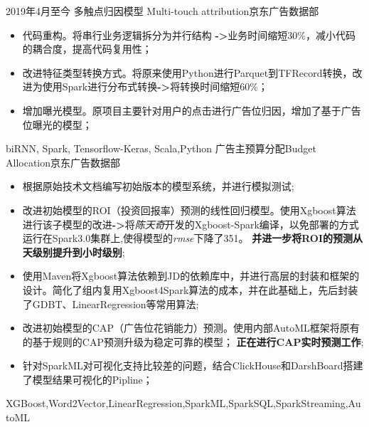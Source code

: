 %
%



\begin{experiences}

 \experience
    {2019年4月至今}   {多触点归因模型}{ Multi-touch attribution}{京东广告数据部}
     {}{
                      \begin{itemize}

                        \item 代码重构。将串行业务逻辑拆分为并行结构 \textbf{->}业务时间缩短30\%，减小代码的耦合度，提高代码复用性；
                        \item 改进特征类型转换方式。将原来使用Python进行Parquet到TFRecord转换，改进为使用Spark进行分布式转换\textbf{->}将转换时间缩短60\%；
                        \item 增加曝光模型。原项目主要针对用户的点击进行广告位归因，增加了基于广告位曝光的模型；

                      \end{itemize}
                    }
                    {biRNN, Spark, Tensorflow-Keras, Scala,Python}
  \emptySeparator
  \experience
    { } {广告主预算分配}{Budget Allocation}{京东广告数据部}
    {}    {
                      \begin{itemize}
                        \item 根据原始技术文档编写初始版本的模型系统，并进行模拟测试;
                        \item 改进初始模型的ROI（投资回报率）预测的线性回归模型。使用Xgboost算法进行该子模型的改进\textbf{->}将\emph{陈天奇}开发的Xgboost-Spark编译，以免部署的方式运行在Spark3.0集群上,使得模型的\emph{rmse}下降了351。 \textbf{并进一步将ROI的预测从天级别提升到小时级别};
                        \item 使用Maven将Xgboost算法依赖到JD的依赖库中，并进行高层的封装和框架的设计。简化了组内复用Xgboost4Spark算法的成本，并在此基础上，先后封装了GDBT、LinearRegression等常用算法;
                        \item 改进初始模型的CAP（广告位花销能力）预测。使用内部AutoML框架将原有的基于规则的CAP预测升级为稳定可靠的模型； \textbf{正在进行CAP实时预测工作};
                        \item 针对SparkML对可视化支持比较差的问题，结合ClickHouse和DarshBoard搭建了模型结果可视化的Pipline；
                      \end{itemize}
                    }
                    {XGBoost,Word2Vector,LinearRegression,SparkML,SparkSQL,SparkStreaming,AutoML}
  \emptySeparator


\end{experiences}
